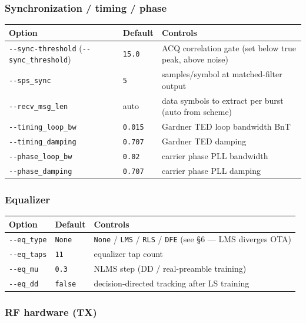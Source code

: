 \documentclass[
  10pt,
]{article}
\begin{document}
\hypertarget{synchronization--timing--phase}{%
\subsubsection{Synchronization / timing /
phase}\label{synchronization--timing--phase}}

\begin{longtable}[]{@{}lll@{}}
\toprule
Option & Default & Controls \\
\midrule
\endhead
\texttt{-\/-sync-threshold} (\texttt{-\/-sync\_threshold}) &
\texttt{15.0} & ACQ correlation gate (set below true peak, above
noise) \\
\texttt{-\/-sps\_sync} & \texttt{5} & samples/symbol at matched-filter
output \\
\texttt{-\/-recv\_msg\_len} & auto & data symbols to extract per burst
(auto from scheme) \\
\texttt{-\/-timing\_loop\_bw} & \texttt{0.015} & Gardner TED loop
bandwidth BnT \\
\texttt{-\/-timing\_damping} & \texttt{0.707} & Gardner TED damping \\
\texttt{-\/-phase\_loop\_bw} & \texttt{0.02} & carrier phase PLL
bandwidth \\
\texttt{-\/-phase\_damping} & \texttt{0.707} & carrier phase PLL
damping \\
\bottomrule
\end{longtable}

\hypertarget{equalizer}{%
\subsubsection{Equalizer}\label{equalizer}}

\begin{longtable}[]{@{}lll@{}}
\toprule
Option & Default & Controls \\
\midrule
\endhead
\texttt{-\/-eq\_type} & \texttt{None} & \texttt{None} / \texttt{LMS} /
\texttt{RLS} / \texttt{DFE} (see §6 --- LMS diverges OTA) \\
\texttt{-\/-eq\_taps} & \texttt{11} & equalizer tap count \\
\texttt{-\/-eq\_mu} & \texttt{0.3} & NLMS step (DD / real-preamble
training) \\
\texttt{-\/-eq\_dd} & \texttt{false} & decision-directed tracking after
LS training \\
\bottomrule
\end{longtable}

\hypertarget{rf-hardware-tx}{%
\subsubsection{RF hardware (TX)}\label{rf-hardware-tx}}
\end{document}
